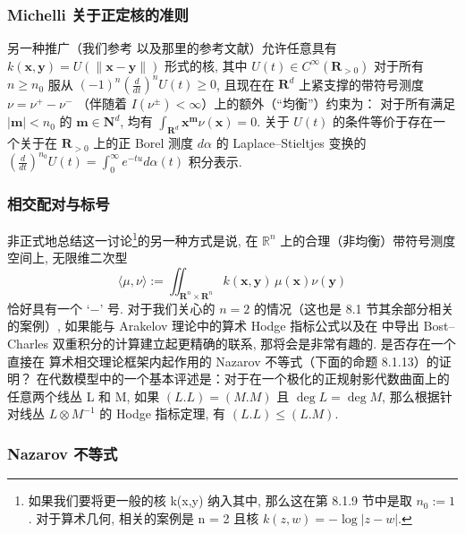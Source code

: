 \subsubsection{Michelli 关于正定核的准则}\label{sec:8.1.9}

另一种推广（我们参考 \cite{Mat97} 以及那里的参考文献）允许任意具有 \(k(\mathbf{x}, \mathbf{y}) = U(\|\mathbf{x} - \mathbf{y}\|)\) 形式的核, 
其中 \(U(t) \in C^{\infty}(\mathbf{R}_{>0})\) 对于所有 \(n \geq n_0\) 服从 \((-1)^n \left(\frac{d}{dt}\right)^n U(t) \geq 0\), 
且现在在 \(\mathbf{R}^d\) 上紧支撑的带符号测度 \(\nu = \nu^+ - \nu^-\) （伴随着 \(I(\nu^{\pm}) < \infty\)）上的额外（``均衡''）约束为： 
对于所有满足 \(|\mathbf{m}| < n_0\) 的 \(\mathbf{m} \in \mathbf{N}^d\), 均有 \(\int_{\mathbf{R}^d} \mathbf{x}^{\mathbf{m}} \nu(\mathbf{x}) = 0\). 
关于 \(U(t)\) 的条件等价于存在一个关于在 \(\mathbf{R}_{>0}\) 上的正 Borel 测度 \(d\alpha\) 的 Laplace--Stieltjes 变换的 \(\left(\frac{d}{dt}\right)^{n_0} U(t) = \int_0^{\infty} e^{-tu} d\alpha(t)\) 积分表示.

\subsubsection{相交配对与标号}\label{sec:8.1.10}

非正式地总结这一讨论\footnote{如果我们要将更一般的核 k(x,y) 纳入其中, 那么这在第 8.1.9 节中是取 \(n_0 := 1\). 
对于算术几何, 相关的案例是 n = 2 且核 \(k(z, w) = -\log|z - w|\).}的另一种方式是说, 
在 \(\mathbb{R}^n\) 上的合理（非均衡）带符号测度空间上, 
无限维二次型
\[ \langle \mu, \nu \rangle := \iint_{\mathbf{R}^n \times \mathbf{R}^n} k(\mathbf{x}, \mathbf{y}) \, \mu (\mathbf{x}) \nu(\mathbf{y}) \]
恰好具有一个 `\(-\)' 号. 
对于我们关心的 \(n=2\) 的情况（这也是 8.1 节其余部分相关的案例）, 
如果能与 Arakelov 理论中的算术 Hodge 指标公式以及在 \cite[第 5 节]{BC22} 中导出 Bost--Charles 双重积分的计算建立起更精确的联系, 
那将会是非常有趣的. 
是否存在一个直接在 \cite{BC22} 算术相交理论框架内起作用的 Nazarov 不等式（下面的命题 8.1.13）的证明？ 
在代数模型中的一个基本评述是：对于在一个极化的正规射影代数曲面上的任意两个线丛 L 和 M, 
如果 \((L.L) = (M.M)\) 且 \(\deg L = \deg M\), 
那么根据针对线丛 \(L \otimes M^{-1}\) 的 Hodge 指标定理, 有 \((L.L) \leq (L.M)\).

\subsubsection{Nazarov 不等式}\label{sec:8.1.11}

